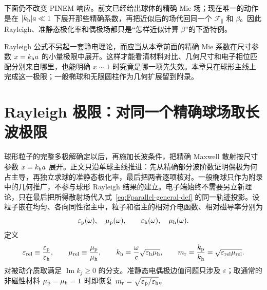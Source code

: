 下面仍不改变 PINEM 响应。前文已经给出球体的精确 Mie 场；现在唯一的动作是在 \(|k_{\rm h}|a\ll1\) 下展开那些精确系数，再把近似后的场代回同一个 \(\mathcal F_{\parallel}\) 和 \(\beta\)。因此 Rayleigh、准静态极化率和偶极场都只是“怎样近似计算 \(\beta\)”的下游特例。

Rayleigh 公式不另起一套静电理论，而应当从本章前面的精确 Mie 系数在尺寸参数 $x=k_{\rm h}a$ 的小量极限中展开。这样才能看清材料对比、几何尺寸和电子相位匹配分别来自哪里，也能明确 $x\sim1$ 时究竟是哪一项先失效。本章只在球形主线上完成这一极限；一般椭球和无限圆柱作为几何扩展留到附录。

\section{Rayleigh 极限：对同一个精确球场取长波极限}

球形粒子的完整多极解确定以后，再施加长波条件，把精确 Maxwell 散射按尺寸参数 $x=k_{\rm h}a$ 展开。正文只沿单球主线推进：先从精确部分波阶数证明偶极为何占主导，再独立求球的准静态极化率，最后把两者逐项核对。一般椭球只作为附录中的几何推广，不参与球形 Rayleigh 结果的建立。电子端始终不需要另立新理论，只在最后把所得散射场代入式~\eqref{eq:Fparallel-general-def} 的同一轨迹投影。设粒子嵌在均匀、各向同性宿主中，粒子和宿主的相对介电函数、相对磁导率分别为
\begin{equation}
\varepsilon_{\rm p}(\omega),\quad \mu_{\rm p}(\omega),
\qquad
\varepsilon_{\rm h}(\omega),\quad \mu_{\rm h}(\omega).
\end{equation}
定义
\begin{equation}
\varepsilon_{\rm rel}\equiv\frac{\varepsilon_{\rm p}}{\varepsilon_{\rm h}},
\qquad
\mu_{\rm rel}\equiv\frac{\mu_{\rm p}}{\mu_{\rm h}},
\qquad
k_{\rm h}=\frac{\omega}{c}
\sqrt{\varepsilon_{\rm h}\mu_{\rm h}},
\qquad
m_{\rm r}=\frac{k_{\rm p}}{k_{\rm h}}
=\sqrt{\varepsilon_{\rm rel}\mu_{\rm rel}}.
\label{eq:host-wave-number}
\end{equation}
对被动介质取满足 $\operatorname{Im}k_j\ge0$ 的分支。准静态电偶极边值问题只涉及 $\varepsilon$；取通常的非磁性材料 $\mu_{\rm p}=\mu_{\rm h}=1$ 时即恢复
$m_{\rm r}=\sqrt{\varepsilon_{\rm p}/\varepsilon_{\rm h}}$。

